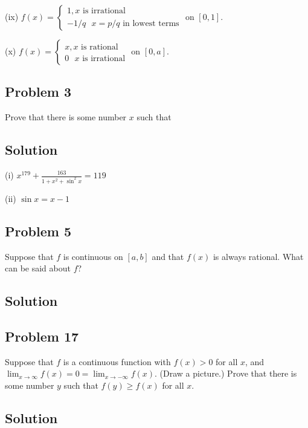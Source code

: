 \vs

(ix) $f(x)=\begin{cases}
  1, \text{$x$ is irrational}\\
  -1/q \ \ \ x=p/q \text{ in lowest terms}
\end{cases}$ on $[0, 1]$.

\vs

(x) $f(x)=\begin{cases}
  x, \text{$x$ is rational}\\
  0 \ \ \ \text{$x$ is irrational}
\end{cases}$ on $[0, a]$.


\subsection*{Problem 3}
Prove that there is some number $x$ such that

\subsection*{Solution}
(i) $x^{179}+\frac{163}{1+x^{2}+\sin^{2} x}=119$

\vs

(ii) $\sin x = x-1$

\subsection*{Problem 5}
Suppose that $f$ is continuous on $[a,b]$ and that $f(x)$ is always
rational. What can be said about $f$?

\subsection*{Solution}

\subsection*{Problem 17}
Suppose that $f$ is a continuous function with $f(x)>0$ for all $x$,
and $\lim_{x\to\infty} f(x)=0=\lim_{x\to-\infty} f(x)$. (Draw a picture.) Prove that
there is some number $y$ such that $f(y)\geq f(x)$ for all $x$.

\subsection*{Solution}

